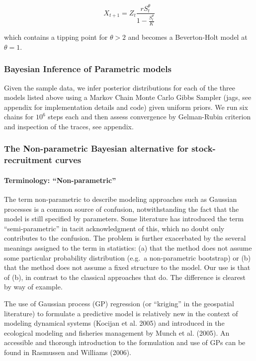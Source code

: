 \documentclass[author-year, review]{elsarticle} %
\begin{document}
\[ X_{t+1} = Z_t \frac{r S_t^{\theta}}{1 - \frac{S_t^\theta}{K}} \]

which contains a tipping point for $\theta > 2$ and becomes a
Beverton-Holt model at $\theta = 1$.

\subsubsection{Bayesian Inference of Parametric models}

Given the sample data, we infer posterior distributions for each of the
three models listed above using a Markov Chain Monte Carlo Gibbs Sampler
(jags, see appendix for implementation details and code) given uniform
priors. We run six chains for $10^6$ steps each and then assess
convergence by Gelman-Rubin criterion and inspection of the traces, see
appendix.

\subsubsection{The Non-parametric Bayesian alternative for
stock-recruitment curves}

\paragraph{Terminology: ``Non-parametric''}

The term non-parametric to describe modeling approaches such as Gaussian
processes is a common source of confusion, notwithstanding the fact that
the model is still specified by parameters. Some literature has
introduced the term ``semi-parametric'' in tacit acknowledgment of this,
which no doubt only contributes to the confusion. The problem is further
exacerbated by the several meanings assigned to the term in statistics:
(a) that the method does not assume some particular probability
distribution (e.g.~a non-parametric bootstrap) or (b) that the method
does not assume a fixed structure to the model. Our use is that of (b),
in contrast to the classical approaches that do. The difference is
clearest by way of example.

The use of Gaussian process (GP) regression (or ``kriging'' in the
geospatial literature) to formulate a predictive model is relatively new
in the context of modeling dynamical systems (Kocijan et al. 2005) and
introduced in the ecological modeling and fisheries management by Munch
et al. (2005). An accessible and thorough introduction to the
formulation and use of GPs can be found in Rasmussen and Williams
(2006).
\end{document}
